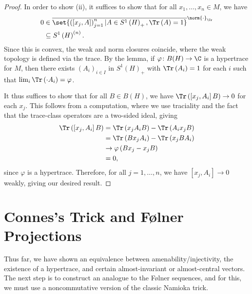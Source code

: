 \documentclass[10pt]{mypackage}
\begin{document}
\begin{proof}
  In order to show (ii), it suffices to show that for all $x_1,\dots,x_n\in M$, we have
  \begin{align*}
    0 &\in \overline{\set{ \left( \left[ x_j,A \right] \right)_{j=1}^{n} | A\in S^1\left( H \right)_{+}, \Tr\left( A \right) = 1 }}^{\norm{\cdot}_{\Tr}}\\
      &\subseteq S^1\left( H \right)^{\left( n \right)}.
  \end{align*}
  Since this is convex, the weak and norm closures coincide, where the weak topology is defined via the trace. By the lemma, if $\varphi\colon B(H)\rightarrow \C$ is a hypertrace for $M$, then there exists $\left( A_i \right)_{i\in I}$ in $S^1\left( H \right)_{+}$ with $\Tr\left( A_i \right) = 1$ for each $i$ such that $\lim_{i}\Tr\left( \cdot A_i \right) = \varphi$.

  It thus suffices to show that for all $B\in B(H)$, we have $\Tr\left( \left[ x_j,A_i \right]B \right) \rightarrow 0$ for each $x_j$. This follows from a computation, where we use traciality and the fact that the trace-class operators are a two-sided ideal, giving
  \begin{align*}
    \Tr\left( \left[ x_j,A_i \right]B \right) &= \Tr\left( x_jA_iB \right)-\Tr\left( A_ix_jB \right)\\
                                              &= \Tr\left( Bx_jA_i \right)-\Tr\left( x_jBA_i \right)\\
                                              &\rightarrow \varphi\left( Bx_j-x_jB \right)\\
                                              &= 0,
  \end{align*}
  since $\varphi$ is a hypertrace. Therefore, for all $j = 1,\dots,n$, we have $\left[ x_j,A_i \right]\rightarrow 0$ weakly, giving our desired result.
\end{proof}
\section{Connes's Trick and Følner Projections}%
Thus far, we have shown an equivalence between amenability/injectivity, the existence of a hypertrace, and certain almost-invariant or almost-central vectors. The next step is to construct an analogue to the Følner sequences, and for this, we must use a noncommutative version of the classic Namioka trick.
\end{document}
